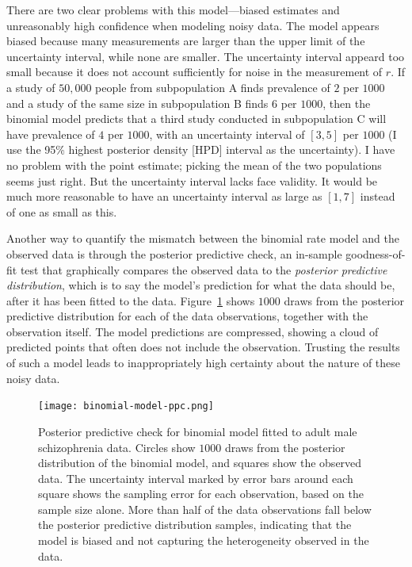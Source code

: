 There are two clear problems with this model---biased estimates and
unreasonably high confidence when modeling noisy data.  The model
appears biased because many measurements are larger than the upper limit
of the uncertainty interval, while none are smaller.  The uncertainty
interval appeard too small because it does not account sufficiently
for noise in the measurement of $r$. If a study of $50,000$ people
from subpopulation A finds prevalence of $2$ per $1000$ and a study of
the same size in subpopulation B finds $6$ per $1000$, then the
binomial model predicts that a third study conducted in subpopulation
C will have prevalence of $4$ per $1000$, with an uncertainty interval
of $[3,5]$ per $1000$ (I use the 95\% highest posterior density [HPD]
interval as the uncertainty).  I have no problem with the point
estimate; picking the mean of the two populations seems just right.
But the uncertainty interval lacks face validity.  It would be much
more reasonable to have an uncertainty interval as large as $[1,7]$
instead of one as small as this.

Another way to quantify the mismatch between the binomial rate model
and the observed data is through the posterior predictive check, an
in-sample goodness-of-fit test that graphically compares the observed
data to the \emph{posterior predictive distribution}, which is to say
the model's prediction for what the data should be, after it has been
fitted to the data.\cite{gelman_bayesian_2003}
Figure~\ref{rate-model-binom-ppc} shows $1000$ draws from the
posterior predictive distribution for each of the data observations,
together with the observation itself.  The model predictions are
compressed, showing a cloud of predicted points that often does not
include the observation.  Trusting the results of such a model leads
to inappropriately high certainty about the nature of these noisy data.

\begin{figure}[ht]
\begin{center}
\texttt{[image: binomial-model-ppc.png]}
\caption[Posterior predictive check for binomial model fitted to adult
  male schizophrenia data.]{Posterior predictive check for binomial model
  fitted to adult
  male schizophrenia data.  Circles show $1000$ draws from
  the posterior distribution of the binomial model, and squares
  show the observed data.  The uncertainty interval marked by error
  bars around each square shows the sampling error for each
  observation, based on the sample size alone. More than half of the
  data observations fall below the posterior predictive distribution
  samples, indicating that the model is biased and not capturing the
  heterogeneity observed in the data.}
\label{rate-model-binom-ppc}
\end{center}
\end{figure}


